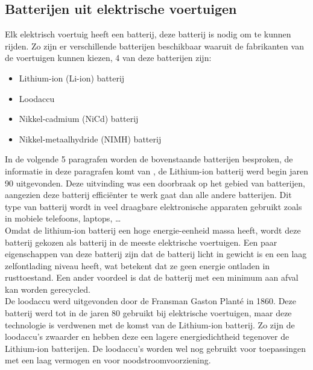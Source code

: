 \subsection{Batterijen uit elektrische voertuigen}
\label{sec:stand-van-zaken-bidirectioneel-laden-batterijen}

Elk elektrisch voertuig heeft een batterij, deze batterij is nodig om te kunnen rijden. Zo zijn er verschillende batterijen beschikbaar waaruit de fabrikanten van de voertuigen kunnen kiezen, 4 van deze batterijen zijn:

\begin{itemize}
    \item Lithium-ion (Li-ion) batterij
    \item Loodaccu
    \item Nikkel-cadmium (NiCd) batterij
    \item Nikkel-metaalhydride (NIMH) batterij
\end{itemize}

In de volgende 5 paragrafen worden de bovenstaande batterijen besproken, de informatie in deze paragrafen komt van \textcite{AnupKumarH2022}, de Lithium-ion batterij werd begin jaren 90 uitgevonden. Deze uitvinding was een doorbraak op het gebied van batterijen, aangezien deze batterij efficiënter te werk gaat dan alle andere batterijen. Dit type van batterij wordt in veel draagbare elektronische apparaten gebruikt zoals in mobiele telefoons, laptops, …\\

Omdat de lithium-ion batterij een hoge energie-eenheid massa heeft, wordt deze batterij gekozen als batterij in de meeste elektrische voertuigen. Een paar eigenschappen van deze batterij zijn dat de batterij licht in gewicht is en een laag zelfontlading niveau heeft, wat betekent dat ze geen energie ontladen in rusttoestand. Een ander voordeel is dat de batterij met een minimum aan afval kan worden gerecycled.\\

De loodaccu werd uitgevonden door de Fransman Gaston Planté in 1860. Deze batterij werd tot in de jaren 80 gebruikt bij elektrische voertuigen, maar deze technologie is verdwenen met de komst van de Lithium-ion batterij. Zo zijn de loodaccu’s zwaarder en hebben deze een lagere energiedichtheid tegenover de Lithium-ion batterijen. De loodaccu’s worden wel nog gebruikt voor toepassingen met een laag vermogen en voor noodstroomvoorziening.\\

